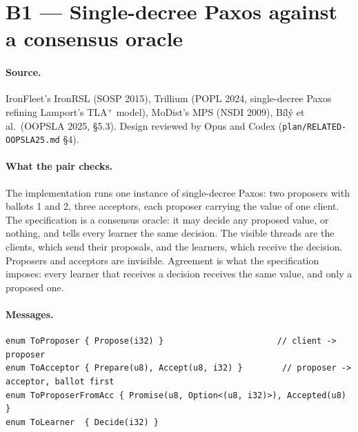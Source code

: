 \documentclass[11pt,a4paper]{article}
\newcommand{\code}[1]{\texttt{#1}}
\begin{document}
\tableofcontents

\section{B1 --- Single-decree Paxos against a consensus oracle}

\paragraph{Source.} IronFleet's IronRSL (SOSP 2015), Trillium (POPL 2024, single-decree Paxos
refining Lamport's TLA$^+$ model), MoDist's MPS (NSDI 2009), B\'il\'y et al.\ (OOPSLA 2025, \S5.3).
Design reviewed by Opus and Codex (\code{plan/RELATED-OOPSLA25.md} \S4).

\paragraph{What the pair checks.} The implementation runs one instance of single-decree Paxos:
two proposers with ballots 1 and 2, three acceptors, each proposer carrying the value of one
client. The specification is a consensus oracle: it may decide any proposed value, or nothing,
and tells every learner the same decision. The visible threads are the clients, which send
their proposals, and the learners, which receive the decision. Proposers and acceptors are
invisible. Agreement is what the specification imposes: every learner that receives a decision
receives the same value, and only a proposed one.

\paragraph{Messages.}
\begin{lstlisting}
enum ToProposer { Propose(i32) }                       // client -> proposer
enum ToAcceptor { Prepare(u8), Accept(u8, i32) }        // proposer -> acceptor, ballot first
enum ToProposerFromAcc { Promise(u8, Option<(u8, i32)>), Accepted(u8) }
enum ToLearner  { Decide(i32) }
\end{lstlisting}
\end{document}
